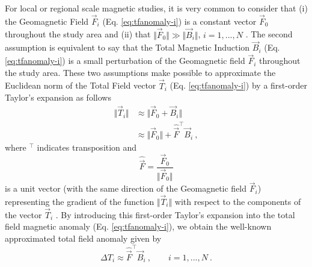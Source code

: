 \documentclass[journal abbreviation, npg]{copernicus}
\begin{document}
For local or regional scale magnetic studies, it is very common to consider that (i) the Geomagnetic Field $\vec{F}_i$ (Eq. \ref{eq:tfanomaly-i}) is a constant vector $\vec{F}_{0}$ throughout the study area and (ii) that $\Vert \vec{F}_{0} \Vert \gg \Vert \vec{B}_{i} \Vert$, $i = 1, ..., N$ \citep{telford-etal1990, blakely1996}. The second assumption is equivalent to say that the Total Magnetic Induction $\vec{B}_i$ (Eq. \ref{eq:tfanomaly-i}) is a small perturbation of the Geomagnetic field $\vec{F}_i$ throughout the study area. These two assumptions make possible to approximate the Euclidean norm of the Total Field vector $\vec{T}_i$ (Eq. \ref{eq:tfanomaly-i}) by a first-order Taylor's expansion as follows
\begin{equation}
\begin{array}{cl}
\Vert \vec{T}_{i} \Vert & 
\approx \Vert \vec{F}_{0} + \vec{B}_{i} \Vert \\
\: &
\approx \Vert \vec{F}_{0} \Vert + \hat{\vec{F}}^{\intercal}\vec{B}_{i} \: ,
\end{array}
\label{eq:total-field-app}
\end{equation}
where $^{\intercal}$ indicates transposition and
\begin{equation}
\hat{\vec{F}} = \dfrac{\vec{F}_{0}}{\Vert \vec{F}_{0} \Vert}
\label{eq:unit-vector}
\end{equation}
is a unit vector (with the same direction of the Geomagnetic field $\vec{F}_i$) representing the gradient of the function $\Vert \vec{T}_{i} \Vert$ with respect to the components of the vector $\vec{T}_{i}$ \citep{blakely1996}. By introducing this first-order Taylor's expansion into the total field magnetic anomaly (Eq. \ref{eq:tfanomaly-i}), we obtain the well-known approximated total field anomaly given by
\begin{equation}
\Delta T_{i} \approx \hat{\vec{F}}^{\intercal}\vec{B}_{i} \: , \qquad i = 1, ..., N \: .
\label{eq:approx-tfanomaly-i}
\end{equation}
\end{document}

